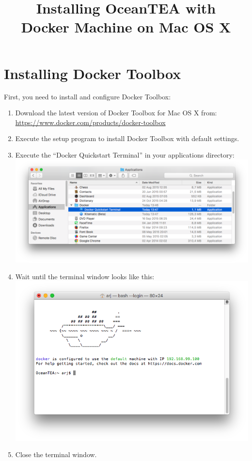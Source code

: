 \documentclass[12pt,a4paper,english,oneside,parskip=false]{scrartcl} %
\begin{document}
\title{Installing OceanTEA with\\Docker Machine on Mac OS X}
\date{}

\maketitle

\section{Installing Docker Toolbox} \label{sec:docker}

First, you need to install and configure Docker Toolbox: 
\begin{enumerate}
	\item Download the latest version of Docker Toolbox for Mac OS X from:\\ \url{https://www.docker.com/products/docker-toolbox}
	\item Execute the setup program to install Docker Toolbox with default settings.
	\item Execute the \enquote{Docker Quickstart Terminal} in your applications directory:\\
	\includegraphics[width=\linewidth]{fig/start_docker_machine}
	\item Wait until the terminal window looks like this:\\
	\includegraphics[width=\linewidth]{fig/docker_machine}
	\item Close the terminal window.
\end{enumerate}
\end{document}
